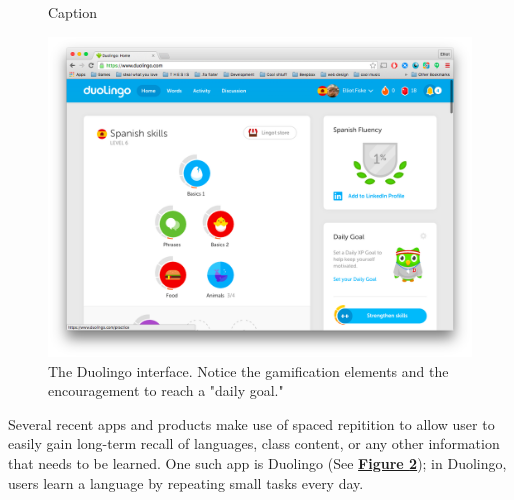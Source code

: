 \begin{figure}
	\caption{Caption}
	\label{fig:key}
\end{figure}

\begin{figure}
	\centerline{\includegraphics[width=1.2\linewidth]{duolingo}}
	\caption[Duolingo]{The Duolingo interface. Notice the gamification elements and the encouragement to reach a "daily goal."}
	\label{fig:duolingo}
\end{figure}

\par Several recent apps and products make use of spaced repitition to allow user to easily gain long-term recall of languages, class content, or any other information that needs to be learned. One such app is Duolingo (See \textbf{\hyperref[fig:duolingo]{Figure \ref*{fig:duolingo}}}); in Duolingo, users learn a language by repeating small tasks every day. 

